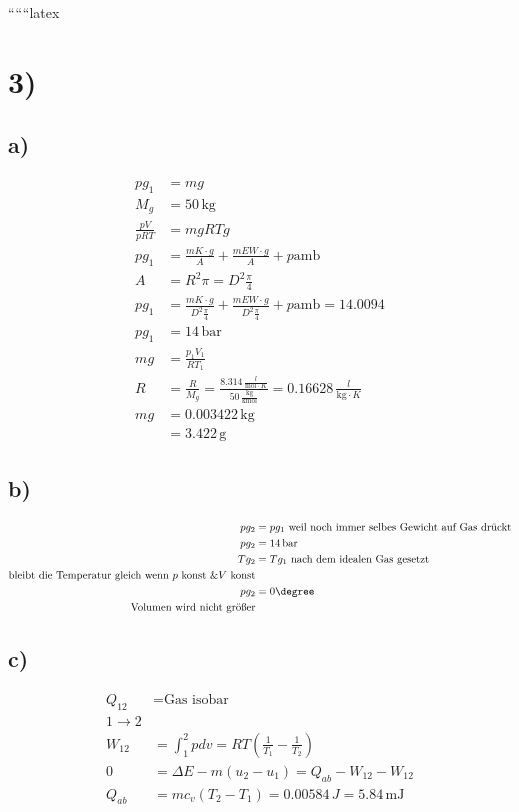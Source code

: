
``````latex

\section*{3)}

\subsection*{a)}
\begin{align*}
    p g_1 &= m g \\
    M_g &= 50 \, \text{kg} \\
    \frac{p V}{p R T} &= m g R T g \\
    p g_1 &= \frac{m K \cdot g}{A} + \frac{m E W \cdot g}{A} + p \text{amb} \\
    A &= R^2 \pi = D^2 \frac{\pi}{4} \\
    p g_1 &= \frac{m K \cdot g}{D^2 \frac{\pi}{4}} + \frac{m E W \cdot g}{D^2 \frac{\pi}{4}} + p \text{amb} = 14.0094 \\
    p g_1 &= 14 \, \text{bar} \\
    m g &= \frac{p_1 V_1}{R T_1} \\
    R &= \frac{R}{M_g} = \frac{8.314 \, \frac{l}{\text{mol} \cdot K}}{50 \, \frac{\text{kg}}{\text{kmol}}} = 0.16628 \, \frac{l}{\text{kg} \cdot K} \\
    m g &= 0.003422 \, \text{kg} \\
    &= 3.422 \, \text{g}
\end{align*}

\subsection*{b)}
\begin{align*}
    p g_2 &= p g_1 \text{ weil noch immer selbes Gewicht auf Gas drückt} \\
    p g_2 &= 14 \, \text{bar} \\
    T g_2 &= T g_1 \text{ nach dem idealen Gas gesetzt} \\
    \text{bleibt die Temperatur gleich wenn } p \text{ konst } \& V \text{ konst} \\
    p g_2 &= 0 \degree \\
    \text{Volumen wird nicht größer}
\end{align*}

\subsection*{c)}
\begin{align*}
    Q_{12} &= \text{Gas isobar} \\
    1 \rightarrow 2 \\
    W_{12} &= \int_1^2 p dv = R T \left( \frac{1}{T_1} - \frac{1}{T_2} \right) \\
    0 &= \Delta E - m (u_2 - u_1) = Q_{ab} - W_{12} - W_{12} \\
    Q_{ab} &= m c_v (T_2 - T_1) = 0.00584 \, J = 5.84 \, \text{mJ}
\end{align*}

